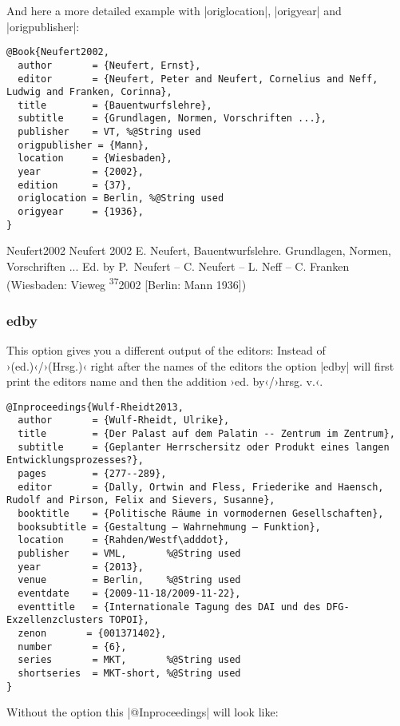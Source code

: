 \documentclass[a4paper,
10pt,
greek,
french,
spanish,
italian,
ngerman,
english
]{ltxdoc}
\begin{document}
 And here a more detailed example with |origlocation|, |origyear| and |origpublisher|:
 \begin{lstlisting}[style=bibentry,label=Neufert2002,caption={{@}Book\{Neufert2002,…\} }]
 @Book{Neufert2002,
  author       = {Neufert, Ernst},
  editor       = {Neufert, Peter and Neufert, Cornelius and Neff, Ludwig and Franken, Corinna},
  title        = {Bauentwurfslehre},
  subtitle     = {Grundlagen, Normen, Vorschriften ...},
  publisher    = VT, %@String used
  origpublisher = {Mann},
  location     = {Wiesbaden},
  year         = {2002},
  edition      = {37},
  origlocation = Berlin, %@String used
  origyear     = {1936},
}
\end{lstlisting}
  \begin{bibbsp}{Neufert2002}
Neufert  2002\hspace{3em} E. Neufert, Bauentwurfslehre. Grundlagen, Normen, Vorschriften ... Ed. by P.~Neufert – C. Neufert – L. Neff  – C. Franken {\color{red}  (Wiesbaden: Vieweg \textsuperscript{37}2002 [Berlin: Mann 1936])}
 \end{bibbsp}
 
\subsubsection{edby}\label{edby}
This option gives you a different output of the editors: Instead of ›(ed.)‹/›(Hrsg.)‹ right after the names of the editors  the option |edby| will first print the editors name and then the addition ›ed. by‹/›hrsg. v.‹.

\begin{lstlisting}[style=bibentry,label=Wulf-Rheidt2013,caption={{@}Inproceedings\{Wulf-Rheidt2013,…\} }]
@Inproceedings{Wulf-Rheidt2013,
  author       = {Wulf-Rheidt, Ulrike},
  title        = {Der Palast auf dem Palatin -- Zentrum im Zentrum},
  subtitle     = {Geplanter Herrschersitz oder Produkt eines langen Entwicklungsprozesses?},
  pages        = {277--289},
  editor       = {Dally, Ortwin and Fless, Friederike and Haensch, Rudolf and Pirson, Felix and Sievers, Susanne},
  booktitle    = {Politische Räume in vormodernen Gesellschaften},
  booksubtitle = {Gestaltung – Wahrnehmung – Funktion},
  location     = {Rahden/Westf\adddot},
  publisher    = VML,		%@String used
  year         = {2013},
  venue        = Berlin, 	%@String used
  eventdate    = {2009-11-18/2009-11-22},
  eventtitle   = {Internationale Tagung des DAI und des DFG-Exzellenzclusters TOPOI},
  zenon       = {001371402},
  number       = {6},
  series       = MKT,		%@String used
  shortseries  = MKT-short,	%@String used
}
\end{lstlisting}
Without the option this |@Inproceedings| will look like:
 
\end{document}
